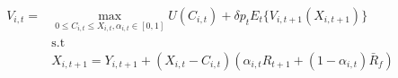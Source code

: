 	\begin{align}
		V_{i,t} =& \max_{0\leq C_{i,t} \leq X_{i,t}, \alpha_{i,t}\in[0,1]} U(C_{i,t}) + \delta p_t E_t\{ V_{i,t+1} (X_{i,t+1}) \}\\
		&\text{s.t} \nonumber \\
		&X_{i,t+1} = Y_{i,t+1} + (X_{i,t} - C_{i,t})(\alpha_{i,t} R_{t+1} + (1-\alpha_{i,t})\bar{R}_f)
	\end{align}
